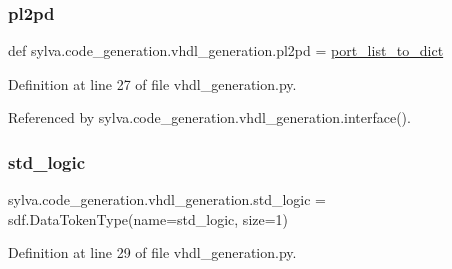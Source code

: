 \subsubsection{\texorpdfstring{pl2pd}{pl2pd}}
{\footnotesize\ttfamily def sylva.\+code\+\_\+generation.\+vhdl\+\_\+generation.\+pl2pd = \hyperlink{namespacesylva_1_1code__generation_1_1vhdl__generation_a51a60df4116e05e838a7d6c61f434df5}{port\+\_\+list\+\_\+to\+\_\+dict}}



Definition at line 27 of file vhdl\+\_\+generation.\+py.



Referenced by sylva.\+code\+\_\+generation.\+vhdl\+\_\+generation.\+interface().

\mbox{\label{namespacesylva_1_1code__generation_1_1vhdl__generation_a85e74939ca684a8a978805b5918467c8}} 
\subsubsection{\texorpdfstring{std\+\_\+logic}{std\_logic}}
{\footnotesize\ttfamily sylva.\+code\+\_\+generation.\+vhdl\+\_\+generation.\+std\+\_\+logic = sdf.\+Data\+Token\+Type(name=\textquotesingle{}std\+\_\+logic\textquotesingle{}, size=1)}



Definition at line 29 of file vhdl\+\_\+generation.\+py.

